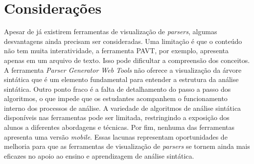 \begin{figure}[t!]
    \captionsetup{width=16cm}
\end{figure}

\section{Considerações}
Apesar de já existirem ferramentas de visualização de \textit{parsers}, algumas desvantagens ainda precisam ser consideradas. Uma limitação é que o conteúdo não tem muita interatividade, a ferramenta PAVT, por exemplo, apresenta apenas em um arquivo de texto. Isso pode dificultar a compreensão dos conceitos. A ferramenta \textit{Parser Generator Web Tools} não oferece a visualização da árvore sintática que é um elemento fundamental para entender a estrutura da análise sintática. Outro ponto fraco é a falta de detalhamento do passo a passo dos algoritmos, o que impede que os estudantes acompanhem o funcionamento interno dos processos de análise. A variedade de algoritmos de análise sintática disponíveis nas ferramentas pode ser limitada, restringindo a exposição dos alunos a diferentes abordagens e técnicas. Por fim, nenhuma das ferramentas apresenta uma versão \textit{mobile}. Essas lacunas representam oportunidades de melhoria para que as ferramentas de visualização de \textit{parsers} se tornem ainda mais eficazes no apoio ao ensino e aprendizagem de análise sintática.
